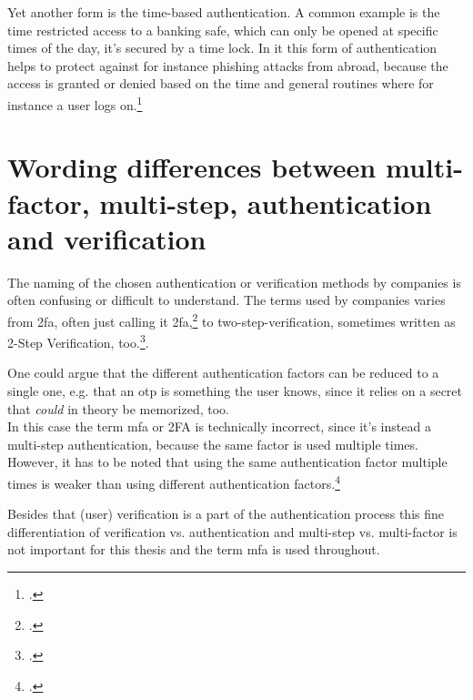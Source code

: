 Yet another form is the time-based authentication. A common example is the time restricted access to a banking safe, which can only be opened at specific times of the day, it's secured by a time lock. In \gls{it} this form of authentication helps to protect against for instance phishing attacks from abroad, because the access is granted or denied based on the time and general routines where for instance a user logs on.\footcite[See][191]{dasgupta2017multi}

\section{Wording differences between multi-factor, multi-step, authentication and verification}

The naming of the chosen authentication or verification methods by companies is often confusing or difficult to understand. The terms used by companies varies from \gls{2fa}, often just calling it \gls{2fa},\footcite{apple_2fa} to two-step-verification, sometimes written as 2-Step Verification, too.\footcites[][]{apple_s2v}[][]{playstation}[][]{google_2-step_verification}[][]{microsoft_2sv}.

One could argue that the different authentication factors can be reduced to a single one, e.g. that an \gls{otp} is \frqq something the user knows\flqq{}, since it relies on a secret that \textit{could} in theory be memorized, too.\\
In this case the term \gls{mfa} or 2FA is technically incorrect, since it's instead a multi-step authentication, because the same factor is used multiple times. However, it has to be noted that using the same authentication factor multiple times is weaker than using different authentication factors.\footcite[See][117]{grimes2017hacking}

Besides that (user) verification is a part of the authentication process this fine differentiation of verification vs. authentication and multi-step vs. multi-factor is not important for this thesis and the term \gls{mfa} is used throughout.

